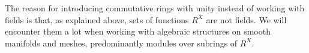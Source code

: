 \begin{remark}
  The reason for introducing commutative rings with unity instead of working
  with fields is that, as explained above, sets of functions $R^X$ are not
  fields.
  We will encounter them a lot when working with algebraic structures on smooth
  manifolds and meshes, predominantly modules over subrings of $R^X$.
\end{remark}
